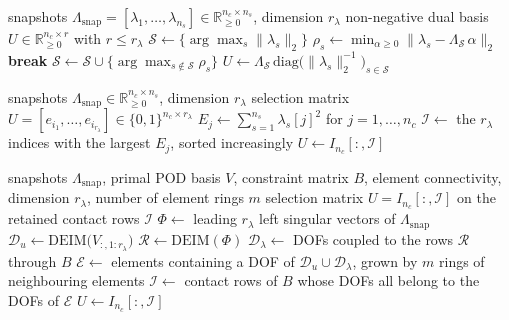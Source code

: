 \documentclass[11pt,a4paper]{article}
\begin{document}
\begin{algorithm}[H]\small
\caption{Cone-projected greedy dual basis (CPG).}\label{alg:cpg}
\begin{algorithmic}[1]
\Require snapshots $\Lambda_{\mathrm{snap}}=[\lambda_1,\dots,\lambda_{n_s}]\in\mathbb{R}^{n_c\times n_s}_{\ge 0}$, dimension $r_\lambda$
\Ensure non-negative dual basis $U\in\mathbb{R}^{n_c\times r}_{\ge 0}$ with $r\le r_\lambda$
\State $\mathcal{S}\gets\{\arg\max_s\|\lambda_s\|_2\}$
    \State $\rho_s\gets\min_{\alpha\ge 0}\|\lambda_s-\Lambda_{\mathcal{S}}\,\alpha\|_2$ 
  \EndFor
   \State \textbf{break} \EndIf
  \State $\mathcal{S}\gets\mathcal{S}\cup\{\arg\max_{s\notin\mathcal{S}}\rho_s\}$ 
\EndWhile
\State \Return $U\gets\Lambda_{\mathcal{S}}\,\mathrm{diag}\big(\|\lambda_s\|_2^{-1}\big)_{s\in\mathcal{S}}$ 
\end{algorithmic}
\end{algorithm}
\begin{algorithm}[H]\small
\caption{Greedy index selection dual basis (gIS).}\label{alg:gis}
\begin{algorithmic}[1]
\Require snapshots $\Lambda_{\mathrm{snap}}\in\mathbb{R}^{n_c\times n_s}_{\ge 0}$, dimension $r_\lambda$
\Ensure selection matrix $U=[e_{i_1},\dots,e_{i_{r_\lambda}}]\in\{0,1\}^{n_c\times r_\lambda}$
\State $E_j\gets\sum_{s=1}^{n_s}\lambda_s[j]^2$ for $j=1,\dots,n_c$ 
\State $\mathcal{I}\gets$ the $r_\lambda$ indices with the largest $E_j$, sorted increasingly
\State \Return $U\gets I_{n_c}[:,\mathcal{I}]$
\end{algorithmic}
\end{algorithm}
\begin{algorithm}[H]\small
\caption{Reduced integration domain dual basis (RID).}\label{alg:rid}
\begin{algorithmic}[1]
\Require snapshots $\Lambda_{\mathrm{snap}}$, primal POD basis $V$, constraint matrix $B$, element connectivity, dimension $r_\lambda$, number of element rings $m$
\Ensure selection matrix $U=I_{n_c}[:,\mathcal{I}]$ on the retained contact rows $\mathcal{I}$
\State $\Phi\gets$ leading $r_\lambda$ left singular vectors of $\Lambda_{\mathrm{snap}}$
\State $\mathcal{D}_u\gets\mathrm{DEIM}\big(V_{:,1:r_\lambda}\big)$ 
\State $\mathcal{R}\gets\mathrm{DEIM}(\Phi)$ 
\State $\mathcal{D}_\lambda\gets$ DOFs coupled to the rows $\mathcal{R}$ through $B$
\State $\mathcal{E}\gets$ elements containing a DOF of $\mathcal{D}_u\cup\mathcal{D}_\lambda$, grown by $m$ rings of neighbouring elements
\State $\mathcal{I}\gets$ contact rows of $B$ whose DOFs all belong to the DOFs of $\mathcal{E}$
\State \Return $U\gets I_{n_c}[:,\mathcal{I}]$ 
\end{algorithmic}
\end{algorithm}
\end{document}
